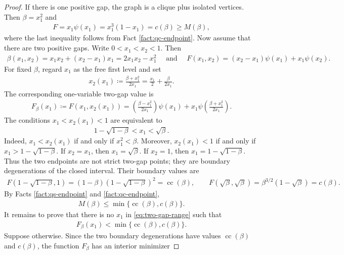 \documentclass[10pt,a4paper]{article}
\newcommand{\cc}{\operatorname{cc}}
\begin{document}
\begin{proof}
If there is one positive gap, the graph is a clique plus isolated vertices.  Then $\beta=x_1^2$ and
\begin{align*}
  F=x_1\psi(x_1)=x_1^3(1-x_1)=c(\beta)\ge M(\beta),
\end{align*}
where the last inequality follows from Fact \ref{fact:qc-endpoint}.
Now assume that there are two positive gaps.  Write $0<x_1<x_2<1$.  Then
\begin{align*}
    \beta(x_1,x_2)=x_1x_2+(x_2-x_1)x_1=2x_1x_2-x_1^2\quad\text{ and }\quad
  F(x_1,x_2)=(x_2-x_1)\psi(x_1)+x_1\psi(x_2).
  \end{align*}
For fixed $\beta$, regard $x_1$ as the free first level and set
\begin{align*}
  x_2(x_1)\coloneqq\frac{\beta+x_1^2}{2x_1}=\frac{x_1}{2}+\frac{\beta}{2x_1}.
\end{align*}
The corresponding one-variable two-gap value is
\begin{align}\label{eq:Fbeta-two}
  F_\beta(x_1)\coloneqq F(x_1,x_2(x_1))=\left(\frac{\beta-x_1^2}{2x_1}\right)\psi(x_1)+x_1\psi\left(\frac{\beta+x_1^2}{2x_1}\right).
\end{align}
The conditions $x_1<x_2(x_1)<1$ are equivalent to
\begin{align}\label{eq:two-gap-range}
  1-\sqrt{1-\beta}<x_1<\sqrt\beta.
\end{align}
Indeed, $x_1<x_2(x_1)$ if and only if $x_1^2<\beta$. Moreover,
$x_2(x_1)<1$ if and only if $x_1>1-\sqrt{1-\beta}.$ If $x_2=x_1$, then $x_1=\sqrt{\beta}$. If $x_2=1$, then $x_1=1-\sqrt{1-\beta}$.
Thus the two endpoints are not strict two-gap points; they are boundary
degenerations of the closed interval.  Their boundary values are
\begin{align*}
  F(1-\sqrt{1-\beta},1)=(1-\beta)(1-\sqrt{1-\beta})^2=\cc(\beta),
  \qquad
  F(\sqrt\beta,\sqrt\beta)=\beta^{3/2}(1-\sqrt{\beta})=c(\beta).
\end{align*}
By Facts \ref{fact:qs-endpoint} and \ref{fact:qc-endpoint},
\begin{align}\label{eq:M-below-endpoints}
  M(\beta)\le\min\{\cc(\beta),c(\beta)\}.
\end{align}
It remains to prove that there is no $x_1$ in \eqref{eq:two-gap-range} such
that
\begin{align*}
  F_\beta(x_1)<\min\{\cc(\beta),c(\beta)\}.
\end{align*}
Suppose otherwise.  Since the two boundary degenerations have values
$\cc(\beta)$ and $c(\beta)$, the function $F_\beta$ has an interior minimizer

\end{proof}
\end{document}
